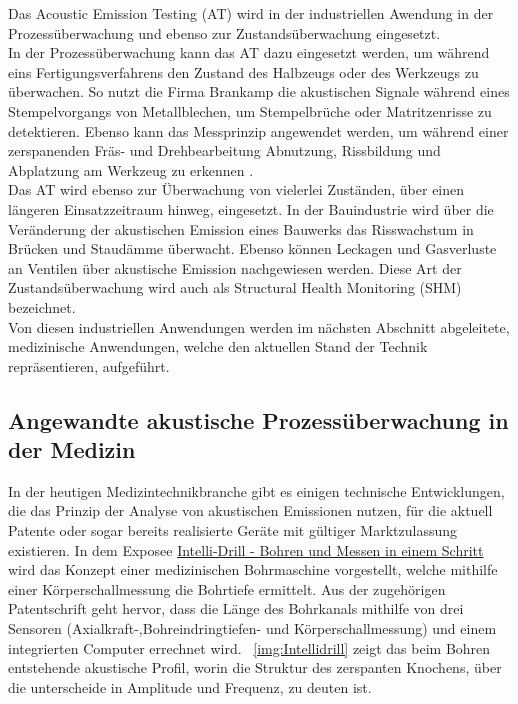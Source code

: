 \documentclass[twoside, 12pt, a4paper]{article}
\begin{document}
	Das Acoustic Emission Testing (AT) wird in der industriellen Awendung in der Prozess\"uberwachung und ebenso zur  Zustands\"uberwachung eingesetzt.\\
	In der Prozess\"uberwachung kann das AT dazu eingesetzt werden, um w\"ahrend eins Fertigungsverfahrens den Zustand des Halbzeugs oder des Werkzeugs zu \"uberwachen. So nutzt die Firma Brankamp die akustischen Signale w\"ahrend eines Stempelvorgangs von Metallblechen, um Stempelbr\"uche oder Matritzenrisse zu detektieren\cite{Brankamp_prospekt}. Ebenso kann das Messprinzip angewendet werden, um w\"ahrend einer zerspanenden Fr\"as- und Drehbearbeitung Abnutzung, Rissbildung und Abplatzung am Werkzeug zu erkennen \cite{DGZfP-Kompendium}.\\
	Das AT wird ebenso zur \"Uberwachung von vielerlei Zust\"anden, \"uber einen l\"angeren Einsatzzeitraum hinweg, eingesetzt. In der Bauindustrie wird \"uber die Ver\"anderung der akustischen Emission eines Bauwerks das Risswachstum in Br\"ucken und Staud\"amme \"uberwacht. Ebenso k\"onnen Leckagen und Gasverluste an Ventilen \"uber akustische Emission nachgewiesen werden. \cite{DGZfP-Kompendium} Diese Art der Zustands\"uberwachung wird auch als Structural Health Monitoring (SHM) bezeichnet.\\
	Von diesen industriellen Anwendungen werden im n\"achsten Abschnitt abgeleitete, medizinische Anwendungen, welche den aktuellen Stand der Technik repr\"asentieren, aufgef\"uhrt.  

	\subsection{Angewandte akustische Prozess\"uberwachung in der Medizin} \label{sec:Angewandte Technik}
	
	In der heutigen Medizintechnikbranche gibt es einigen technische Entwicklungen, die das Prinzip der Analyse von akustischen Emissionen nutzen, f\"ur die aktuell Patente oder sogar bereits realisierte Ger\"ate mit g\"ultiger Marktzulassung existieren. In dem Exposee \grqq
	\href{https://www.innowi.de/de/unsere_patente/details/intelli-drill---knochenbohrer-un388}{Intelli-Drill - Bohren und Messen in einem Schritt}\grqq{} wird das Konzept einer medizinischen Bohrmaschine vorgestellt, welche mithilfe einer K\"orperschallmessung die Bohrtiefe ermittelt. Aus der zugeh\"origen Patentschrift geht hervor, dass die L\"ange des Bohrkanals mithilfe von drei Sensoren (Axialkraft-,Bohreindringtiefen- und K\"orperschallmessung) und einem integrierten Computer errechnet wird.~\cite{Axel.26.08.2011} \cref{img:Intellidrill} zeigt das beim Bohren entstehende akustische Profil, worin die Struktur des zerspanten Knochens, \"uber die unterscheide in Amplitude und Frequenz, zu deuten ist. 
	
\end{document}
